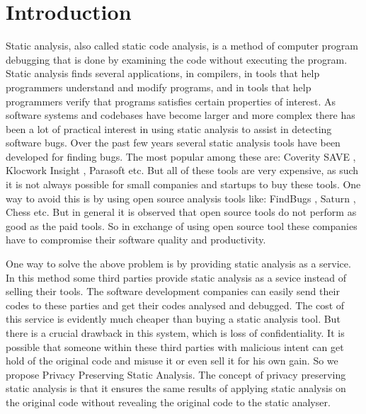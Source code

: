 \section{Introduction}
Static analysis, also called static code analysis, is a method of computer program debugging that is done by examining the code without executing the program. Static analysis finds 
several applications, in compilers, in tools that help programmers understand and modify programs, and in tools that help programmers verify that programs satisfies certain 
properties of interest. As software systems and codebases have become larger and more complex there has been a lot of practical interest in using static analysis to assist in 
detecting software bugs. Over the past few years several static analysis tools have been developed for finding bugs. The most popular among these are: Coverity SAVE \cite{coverity},
Klocwork Insight \cite{klocwork}, Parasoft \cite{parasoft} etc. But all of these tools are very expensive, as such it is not always possible for small companies and startups to buy
these tools. One way to avoid this is by using open source analysis tools like: FindBugs \cite{findbugs}, Saturn \cite{saturn}, Chess \cite{chess} etc. But in general it is observed
that open source tools do not perform as good as the paid tools. So in exchange of using open source tool these companies have to compromise their software quality and productivity.
 
One way to solve the above problem is by providing static analysis as a service. In this method some third parties provide static analysis as a sevice instead of selling their tools.
The software development companies can easily send their codes to these parties and get their codes analysed and debugged. The cost of this service is evidently much cheaper than 
buying a static analysis tool. But there is a crucial drawback in this system, which is loss of confidentiality. It is possible that someone within these third parties with malicious 
intent can get hold of the original code and misuse it or even sell it for his own gain. So we propose Privacy Preserving Static Analysis. The concept of privacy preserving static 
analysis is that it ensures the same results of applying static analysis on the original code without revealing the original code to the static analyser.

